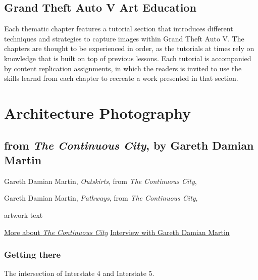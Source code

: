 \documentclass[
  openany]{book}
\begin{document}
\hypertarget{grand-theft-auto-v-art-education}{%
\section{Grand Theft Auto V Art Education}\label{grand-theft-auto-v-art-education}}

Each thematic chapter features a tutorial section that introduces different techniques and strategies to capture images within Grand Theft Auto V. The chapters are thought to be experienced in order, as the tutorials at times rely on knowledge that is built on top of previous lessons. Each tutorial is accompanied by content replication assignments, in which the readers is invited to use the skills learnd from each chapter to recreate a work presented in that section.

\hypertarget{architecture-photography}{%
\chapter{Architecture Photography}\label{architecture-photography}}

\hypertarget{from-the-continuous-city-by-gareth-damian-martin}{%
\section{\texorpdfstring{from \emph{The Continuous City}, by Gareth Damian Martin}{from The Continuous City, by Gareth Damian Martin}}\label{from-the-continuous-city-by-gareth-damian-martin}}

Gareth Damian Martin, \emph{Outskirts}, from \emph{The Continuous City},

Gareth Damian Martin, \emph{Pathways}, from \emph{The Continuous City},

artwork text

\href{https://socks-studio.com/2019/10/13/gareth-damian-martin-postcards-from-the-continuous-city-2018/}{More about \emph{The Continuous City}}
\href{https://www.gamescenes.org/2018/04/interview-gareth-damian-martin-the-aesthetics-of-analogue-game-photography.html}{Interview with Gareth Damian Martin}

\hypertarget{getting-there}{%
\subsection{Getting there}\label{getting-there}}

The intersection of Interstate 4 and Interstate 5.
\end{document}
